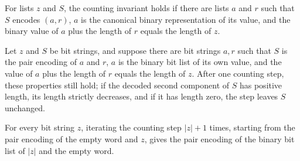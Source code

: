 \begin{definition}
\label{Complexity.BinArith.CountInv}
\leanok
{}
For lists $z$ and $S$, the counting invariant holds if there are lists $a$ and $r$ such
that $S$ encodes $(a,r)$, $a$ is the canonical binary representation of its value, and
the binary value of $a$ plus the length of $r$ equals the length of $z$.
\end{definition}

\begin{theorem}
\label{Complexity.BinArith.countInv_step}
\leanok
{}
Let $z$ and $S$ be bit strings, and suppose there are bit strings $a,r$ such that $S$ is
the pair encoding of $a$ and $r$, $a$ is the binary bit list of its own value, and the
value of $a$ plus the length of $r$ equals the length of $z$. After one counting step,
these properties still hold; if the decoded second component of $S$ has positive length,
its length strictly decreases, and if it has length zero, the step leaves $S$ unchanged.
\end{theorem}

\begin{theorem}
\label{Complexity.BinArith.countLoop_eq}
\leanok
{}
For every bit string $z$, iterating the counting step $|z|+1$ times, starting from the
pair encoding of the empty word and $z$, gives the pair encoding of the binary bit list
of $|z|$ and the empty word.
\end{theorem}

